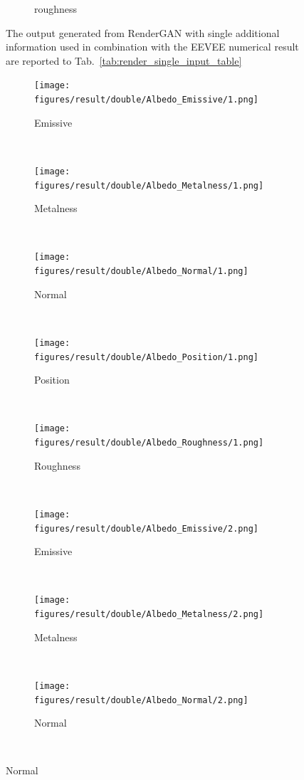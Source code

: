 \begin{figure}[h!]
\begin{subfigure}[b]{0.175\textwidth}
     \caption{roughness}
    \end{subfigure}
    \caption[Generation Result with fixed input on Single input added to EEVEE]{The output generated from RenderGAN with single additional information used in combination with the EEVEE numerical result are reported to Tab.~\ref{tab:render_single_input_table}}
    \label{fig:single_input_generation}
\end{figure}
\begin{figure}[h!]
    \centering
    \begin{subfigure}[b]{0.175\textwidth}
     \texttt{[image: figures/result/double/Albedo\_Emissive/1.png]}
     \caption{Emissive}\label{subfig:1}
    \end{subfigure}
    ~
    \begin{subfigure}[b]{0.175\textwidth}
     \texttt{[image: figures/result/double/Albedo\_Metalness/1.png]}
     \caption{Metalness}
    \end{subfigure}
    ~
    \begin{subfigure}[b]{0.175\textwidth}
     \texttt{[image: figures/result/double/Albedo\_Normal/1.png]}
     \caption{Normal}
    \end{subfigure}
    ~
    \begin{subfigure}[b]{0.175\textwidth}
     \texttt{[image: figures/result/double/Albedo\_Position/1.png]}
     \caption{Position}
    \end{subfigure}
    ~
    \begin{subfigure}[b]{0.175\textwidth}
     \texttt{[image: figures/result/double/Albedo\_Roughness/1.png]}
     \caption{Roughness}
    \end{subfigure}
    \\ \vspace{0.2cm} %
    \begin{subfigure}[b]{0.175\textwidth}
     \texttt{[image: figures/result/double/Albedo\_Emissive/2.png]}
     \caption{Emissive}
     \label{subfig:1}
    \end{subfigure}
    ~
    \begin{subfigure}[b]{0.175\textwidth}
     \texttt{[image: figures/result/double/Albedo\_Metalness/2.png]}
     \caption{Metalness}
    \end{subfigure}
    ~
    \begin{subfigure}[b]{0.175\textwidth}
     \texttt{[image: figures/result/double/Albedo\_Normal/2.png]}
     \caption{Normal}
    \end{subfigure}
    ~

\end{figure}
